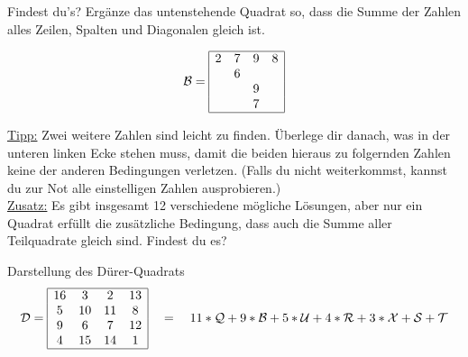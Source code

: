 \documentclass{uebungszettel}
\begin{document}
\pagebreak
\begin{aufgabe}{Findest du's?}
	Erg\"anze das untenstehende Quadrat so, dass die Summe der Zahlen alles Zeilen, Spalten und Diagonalen gleich ist. 
	
	\begin{align*}
	\mathcal{B} =
		\begin{array}{|cccc|}
		\hline
			2 & 7 & 9 & 8 \\ 
			 & 6 &  &  \\ 
			 &  & 9 &  \\ 
			 &  & 7 &  \\
		\hline
		\end{array}  
	\end{align*}
	
	\underline{Tipp:} Zwei weitere Zahlen sind leicht zu finden. \"Uberlege dir danach, was in der unteren linken Ecke stehen muss, damit die beiden hieraus zu folgernden Zahlen keine der anderen Bedingungen verletzen. (Falls du nicht weiterkommst, kannst du zur Not alle einstelligen Zahlen ausprobieren.)\\
	\newline
	\underline{Zusatz:} Es gibt insgesamt 12 verschiedene m\"ogliche L\"osungen, aber nur ein Quadrat erf\"ullt die zus\"atzliche Bedingung, dass auch die Summe aller Teilquadrate gleich sind. Findest du es? 
\end{aufgabe}

\begin{aufgabe}{Darstellung des Dürer-Quadrats}
	\begin{align*}
	\mathcal{D} =
	\begin{array}{|cccc|}
	\hline
		16 & 3 & 2 & 13 \\ 
		5 & 10 &  11& 8  \\ 
		9 &  6 & 7 &  12\\ 
		4 &  15 & 14 &  1\\
	\hline
	\end{array}  
	\quad = \quad  11 * \mathcal{Q} + 9*\mathcal{B} + 5*\mathcal{U} + 4*\mathcal{R} + 3*\mathcal{X} + \mathcal{S} + \mathcal{T}
	\end{align*}
\end{aufgabe}
\end{document}
